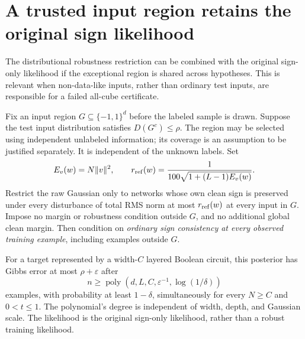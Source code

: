\section{A trusted input region retains the original sign likelihood}
\label{sec:trusted-region}

The distributional robustness restriction can be combined with the original
sign-only likelihood if the exceptional region is shared across hypotheses.
This is relevant when non-data-like inputs, rather than ordinary test inputs,
are responsible for a failed all-cube certificate.

Fix an input region $G\subseteq\{-1,1\}^d$ before the labeled sample is
drawn. Suppose the test input distribution satisfies
$D(G^c)\le\rho$. The region may be selected using independent unlabeled
information; its coverage is an assumption to be justified separately.
It is independent of the unknown labels. Set
\[
 E_v(w)=N\|v\|^2,\qquad
 r_{\rm ref}(w)=\frac1{100\sqrt{1+(L-1)E_v(w)}}.
\]
Restrict the raw Gaussian only to networks whose own clean sign is preserved
under every disturbance of total RMS norm at most $r_{\rm ref}(w)$ at
every input in $G$. Impose no margin or robustness condition outside $G$,
and no additional global clean margin. Then condition on \emph{ordinary
sign consistency at every observed training example}, including examples
outside $G$.

\begin{theorem}
\label{thm:trusted-region}
For a target represented by a width-$C$ layered Boolean circuit, this
posterior has Gibbs error at most $\rho+\varepsilon$ after
\[
 n\ge\operatorname{poly}(d,L,C,\varepsilon^{-1},\log(1/\delta))
\]
examples, with probability at least $1-\delta$, simultaneously for every
$N\ge C$ and $0<t\le1$. The polynomial's degree is independent of width,
depth, and Gaussian scale. The likelihood is the original sign-only
likelihood, rather than a robust training likelihood.
\end{theorem}

